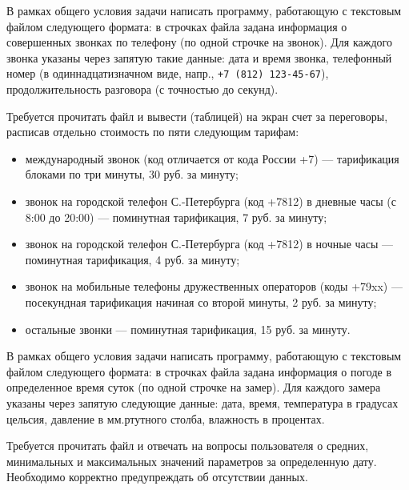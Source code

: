 \begin{zztask}
В рамках общего условия задачи написать программу, работающую с текстовым файлом
следующего формата: в строчках файла задана информация
о совершенных звонках по телефону (по одной строчке на звонок).
Для каждого звонка указаны через запятую такие данные: дата и время звонка, телефонный
номер (в одиннадцатизначном виде, напр., \verb|+7 (812) 123-45-67|), продолжительность 
разговора (с точностью до секунд). 

Требуется прочитать файл и вывести (таблицей) на экран счет за переговоры, расписав
отдельно стоимость по пяти следующим тарифам:
%
\begin{itemize}
\item международный звонок (код отличается от кода России +7) --- тарификация
      блоками по три минуты, 30 руб. за минуту;
\item звонок на городской телефон С.-Петербурга (код +7812) в дневные часы (с
      8:00 до 20:00) --- поминутная тарификация, 7 руб. за минуту;
\item звонок на городской телефон С.-Петербурга (код +7812) в ночные часы ---
      поминутная тарификация, 4 руб. за минуту;
\item звонок на мобильные телефоны дружественных операторов (коды +79xx) ---
      посекундная тарификация начиная со второй минуты, 2 руб. за минуту;
\item остальные звонки --- поминутная тарификация, 15 руб. за минуту.
\end{itemize}
\end{zztask}


\begin{zztask}
В рамках общего условия задачи написать программу, работающую с текстовым файлом
следующего формата: в строчках файла задана информация 
о погоде в определенное время суток (по одной 
строчке на замер). Для каждого замера указаны через запятую следующие данные:
дата, время, температура в градусах цельсия, давление в мм.ртутного столба, влажность
в процентах.

Требуется прочитать файл и отвечать на вопросы пользователя о средних, минимальных и 
максимальных значений параметров за определенную дату. Необходимо корректно предупреждать
об отсутствии данных.
\end{zztask}


